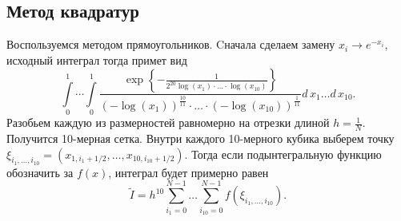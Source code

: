 \documentclass[12pt, a4paper]{article}
\begin{document}
\subsection{Метод квадратур}
Воспользуемся методом прямоугольников. Cначала сделаем замену $x_i \to e^{-x_i}$, исходный интеграл тогда примет вид 
\[
\int\limits_{0}^{1}\cdots\int\limits_{0}^{1} 
	\frac{ \exp\left\{ - \frac{1}{2^{20} \log\left(x_1\right)\cdot \ldots \cdot \log\left( x_{10}\right) } \right\} } 
	 { \left( -\log\left( x_1 \right) \right) ^\frac{10}{11}\cdot\ldots\cdot\left( - \log\left( x_{10} \right)\right)^\frac{1}{11} }
	d\,x_1 \ldots d\,x_{10}.
\]
Разобьем каждую из размерностей равномерно на отрезки длиной $h = \frac 1N$. Получится 10-мерная сетка. Внутри каждого 10-мерного кубика %
выберем точку $\xi_{i_1,\ldots,i_{10}} = (x_{1,i_1+1/2},\ldots,x_{10,i_{10}+1/2})$. Тогда если подынтегральную функцию обозначить за $f(x)$, интеграл будет примерно равен 
\[ \tilde{I} = h^{10}\sum\limits_{i_1 = 0}^{N-1}\dots\sum\limits_{i_{10} = 0}^{N-1} f\left(\xi_{i_1,\ldots,i_{10}}\right).\]
\end{document}
